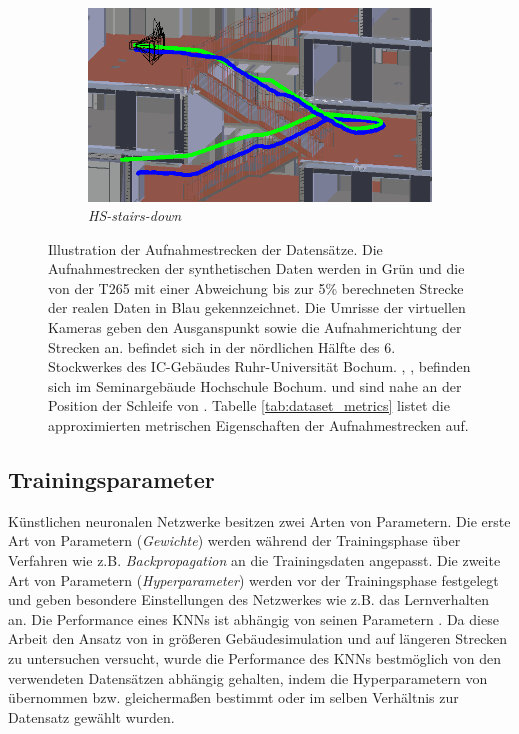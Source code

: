 \begin{figure}
\begin{subfigure}[tl]{0.45\linewidth}
		\flushright		\includegraphics[width=\linewidth]{images/trajectories/hs_down.png}
		\caption{\textit{HS-stairs-down}}
		\label{subfig:traj_hs-down}
	\end{subfigure}
	\hfill
	\caption{Illustration der Aufnahmestrecken der Datensätze. Die Aufnahmestrecken der synthetischen Daten werden in Grün und die von der T265 mit einer Abweichung bis zur 5\% berechneten Strecke der realen Daten in Blau gekennzeichnet. Die Umrisse der virtuellen Kameras geben den Ausganspunkt sowie die Aufnahmerichtung der Strecken an.  befindet sich in der nördlichen Hälfte des 6. Stockwerkes des IC-Gebäudes Ruhr-Universität Bochum. , ,  befinden sich im Seminargebäude Hochschule Bochum.  und  sind nahe an der Position der Schleife von . Tabelle \ref{tab:dataset_metrics} listet die approximierten metrischen Eigenschaften der Aufnahmestrecken auf.}
	\label{fig:trajectories}
\end{figure}

\subsection{Trainingsparameter}
Künstlichen neuronalen Netzwerke besitzen zwei Arten von Parametern. Die erste Art von Parametern (\textit{Gewichte}) werden während der Trainingsphase über Verfahren wie z.B. \textit{Backpropagation} an die Trainingsdaten angepasst.
Die zweite Art von Parametern (\textit{Hyperparameter}) werden vor der Trainingsphase festgelegt und geben besondere Einstellungen des Netzwerkes wie z.B. das Lernverhalten an. Die Performance eines KNNs ist abhängig von seinen Parametern \cite{goodfellowDeepLearning2016}. Da diese Arbeit den Ansatz von \citet{acharyaBIMPoseNetIndoorCamera2019} in größeren Gebäudesimulation und auf längeren Strecken zu untersuchen versucht, wurde die Performance des KNNs bestmöglich von den verwendeten Datensätzen abhängig gehalten, indem die Hyperparametern von \citet{acharyaBIMPoseNetIndoorCamera2019} übernommen bzw. gleichermaßen bestimmt oder im selben Verhältnis zur Datensatz gewählt wurden.

